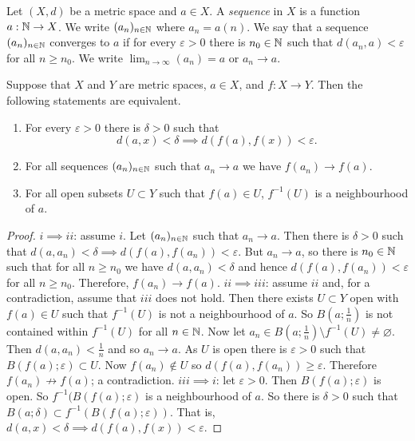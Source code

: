 

\begin{definition}[Sequences]
	Let $(X,d)$ be a metric space and $a \in X$.
	A \emph{sequence} in $X$ is a function $a: \mathbb{N} \to X$.
	We write $(a_n)_{n \in \mathbb{N}}$ where $a_n = a(n)$.
	We say that a sequence $(a_n)_{n \in \mathbb{N}}$ converges to $a$ if for every
	$\varepsilon > 0$ there is $n_0 \in \mathbb{N}$ such that $d(a_n, a) < \varepsilon$
	for all $n \geq n_0$.
	We write $\lim_{n \to \infty} \left( a_n \right) = a$ or $a_n \to a$.
\end{definition}

\begin{proposition}[]
	\label{prop:continuous-metric-space}
	Suppose that $X$ and $Y$ are metric spaces, $a \in X$, and $f: X \to Y$.
	Then the following statements are equivalent.
	\begin{enumerate}
		\item 
			For every $\varepsilon > 0$ there is $\delta > 0$ such that
			\[
				d(a,x) < \delta \implies d(f(a), f(x)) < \varepsilon.
			\]

		\item 
			For all sequences $(a_n)_{n \in \mathbb{N}}$ such that $a_n \to a$ we have 
			$f(a_n) \to f(a)$.

		\item
			For all open subsets $U \subset Y$ such that $f(a) \in U$, 
			$f^{-1}(U)$ is a neighbourhood of $a$.
	\end{enumerate}
\end{proposition}

\begin{proof}
	$i \implies ii$: assume $i$.
	Let $(a_n)_{n \in \mathbb{N}}$ such that $a_n \to a$.
	Then there is $\delta > 0$ such that 
	$d(a,a_n) < \delta \implies d(f(a),f(a_n)) < \varepsilon$.
	But $a_n \to a$, so there is $n_0 \in \mathbb{N}$ such that for all $n \geq n_0$ we
	have $d(a, a_n) < \delta$ and hence $d(f(a), f(a_n)) < \varepsilon$ for all
	$n \geq n_0$. 
	Therefore, $f(a_n) \to f(a)$.
	$ii \implies iii$: assume $ii$ and, for a contradiction, assume that $iii$
	does not hold.
	Then there exists $U \subset Y$ open with $f(a) \in U$ such that $f^{-1}(U)$
	is not a neighbourhood of $a$.
	So $B\left( a; \frac1n \right)$ is not contained within $f^{-1}(U)$ for all
	$n \in \mathbb{N}$.
	Now let $a_n \in B(a; \frac1n) \setminus f^{-1}(U) \neq \varnothing$.
	Then $d(a,a_n) < \frac1n$ and so $a_n \to a$.
	As $U$ is open there is $\varepsilon > 0$ such that 
	$B(f(a); \varepsilon) \subset U$.
	Now $f(a_n) \not\in U$ so $d(f(a), f(a_n)) \geq \varepsilon$.
	Therefore $f(a_n) \not\to f(a)$; a contradiction.
	$iii \implies i$: let $\varepsilon > 0$.
	Then $B(f(a); \varepsilon)$ is open.
	So $f^{-1}(B(f(a); \varepsilon)$ is a neighbourhood of $a$.
	So there is $\delta > 0$ such that
	$B(a; \delta) \subset f^{-1}\left( B(f(a); \varepsilon) \right)$.
	That is,
	$d(a,x) < \delta \implies d(f(a),f(x)) < \varepsilon$.
\end{proof}

